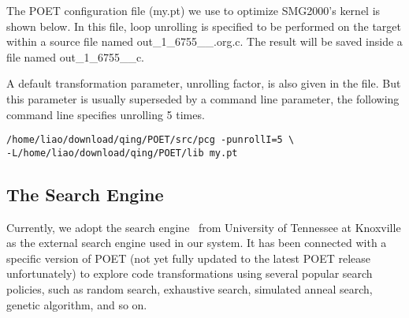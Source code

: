 The POET configuration file (my.pt) we use to optimize SMG2000's kernel is shown
below. In this file, loop unrolling is specified to be performed on the target
within a source file named out\_1\_6755\_\_.org.c. 
The result will be saved inside a file named out\_1\_6755\_\_c.
\lstset{basicstyle=\scriptsize}


A default transformation parameter, unrolling factor, is also given in the
file. But this parameter is usually superseded by a command line
parameter, the following command line specifies unrolling 5 times.
{\mySmallFontSize
\begin{verbatim}
/home/liao/download/qing/POET/src/pcg -punrollI=5 \
-L/home/liao/download/qing/POET/lib my.pt 
\end{verbatim}
}


\subsection{The Search Engine}
Currently, we adopt the search engine~\cite{Youeffective2005} from University of Tennessee
at Knoxville as the external search engine used in our system.  It has been connected with
a specific version of POET (not yet fully updated to the latest POET release
unfortunately) to explore code transformations using several popular search policies,
such as random search, exhaustive search, simulated anneal search, genetic algorithm,
and so on.

